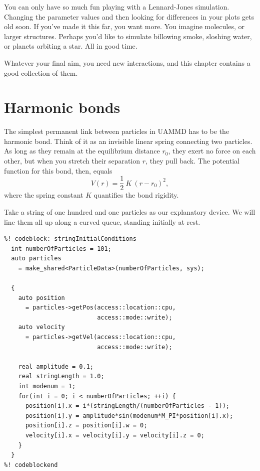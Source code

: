 
You can only have so much fun playing with a Lennard-Jones simulation. Changing
the parameter values and then looking for differences in your plots gets old
soon. If you've made it this far, you want more. You imagine molecules, or
larger structures. Perhaps you'd like to simulate billowing smoke, sloshing
water, or planets orbiting a star. All in good time.

Whatever your final aim, you need new interactions, and this chapter contains a
good collection of them.

\section{Harmonic bonds}

The simplest permanent link between particles in UAMMD has to be the harmonic
bond. Think of it as an invisible linear spring connecting two particles. As
long as they remain at the equilibrium distance $r_0$, they exert no force on
each other, but when you stretch their separation $r$, they pull back. The
potential function for this bond, then, equals
\begin{equation*}
  V(r) = \frac{1}{2}\ K\ (r - r_0)^2,
\end{equation*}
where the spring constant $K$ quantifies the bond rigidity.

Take a string of one hundred and one particles as our explanatory device. We
will line them all up along a curved queue, standing initially at rest.
\label{stringInitialConditions}
\begin{lstlisting}
%! codeblock: stringInitialConditions
  int numberOfParticles = 101;
  auto particles
    = make_shared<ParticleData>(numberOfParticles, sys);

  {
    auto position
      = particles->getPos(access::location::cpu,
                          access::mode::write);
    auto velocity
      = particles->getVel(access::location::cpu,
                          access::mode::write);

    real amplitude = 0.1;
    real stringLength = 1.0;
    int modenum = 1;
    for(int i = 0; i < numberOfParticles; ++i) {
      position[i].x = i*(stringLength/(numberOfParticles - 1));
      position[i].y = amplitude*sin(modenum*M_PI*position[i].x);
      position[i].z = position[i].w = 0;
      velocity[i].x = velocity[i].y = velocity[i].z = 0;
    }
  }
%! codeblockend
\end{lstlisting}

